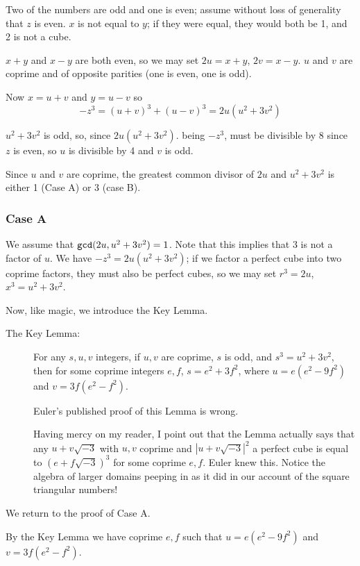 \documentclass[12pt]{article}
\begin{document}
Two of the numbers are odd and one is even;  assume without loss of generality that $z$ is even.  $x$ is not equal to $y$; if they were equal, they would both be 1, and 2 is not a cube.

$x+y$ and $x-y$ are both even, so we may set $2u=x+y$, $2v=x-y$.   $u$ and $v$ are coprime and of opposite parities (one is even, one is odd).

Now $x=u+v$ and $y=u-v$ so
$$-z^3=(u+v)^3+(u-v)^3=2u(u^2+3v^2)$$

$u^2+3v^2$ is odd, so, since $2u(u^2+3v^2)$. being $-z^3$, must be divisible by 8 since $z$ is even, so $u$ is divisible by 4 and $v$ is odd.

Since $u$ and $v$ are coprime, the greatest common divisor of $2u$ and $u^2+3v^2$ is either 1 (Case A) or 3 (case B).

\subsubsection{Case A}

We assume that ${\tt gcd}(2u,u^2+3v^2)=1$.  Note that this implies that 3 is not a factor of $u$.  We have $-z^3=2u(u^2+3v^2)$;
if we factor a perfect cube into two coprime factors, they must also be perfect cubes, so we may set $r^3=2u$, $x^3=u^2+3v^2$.

Now, like magic, we introduce the Key Lemma.

\begin{description}

\item[The Key Lemma:]  For any $s,u,v$ integers, if $u,v$ are coprime, $s$ is odd, and $s^3=u^2+3v^2$, then for some coprime integers $e,f$,
$s=e^2+3f^2$,  where $u=e(e^2-9f^2)$ and $v=3f(e^2-f^2)$.

Euler's published proof of this Lemma is wrong.

Having mercy on my reader, I point out that the Lemma actually says that any $u+v\sqrt{-3}$ with $u,v$ coprime and $|u+v\sqrt{-3}|^2$ a perfect cube
is equal to $(e+f\sqrt{-3})^3$ for some coprime $e,f$.  Euler knew this.  Notice the algebra of larger domains peeping in as it did in our account of the square triangular numbers!


\end{description}

We return to the proof of Case A.

By the Key Lemma we have coprime $e,f$ such that $u=e(e^2-9f^2)$ and $v=3f(e^2-f^2)$.
\end{document}
